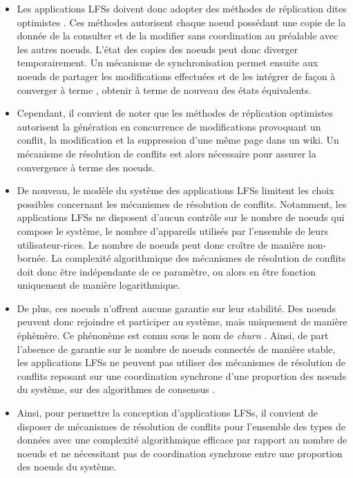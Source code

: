 \begin{itemize}
\begin{definition}[Cohérence]
      \end{definition}
      Les applications \acp{LFS} ne peuvent donc pas reposer sur des méthodes de réplication dites pessimistes, \ie qui empêchent toutes modifications concurrentes d'une même donnée.
    \item Les applications \acp{LFS} doivent donc adopter des méthodes de réplication dites optimistes \cite{2005-optimistic-replication-saito}.
      Ces méthodes autorisent chaque noeud possédant une copie de la donnée de la consulter et de la modifier sans coordination au préalable avec les autres noeuds.
      L'état des copies des noeuds peut donc diverger temporairement.
      Un mécanisme de synchronisation permet ensuite aux noeuds de partager les modifications effectuées et de les intégrer de façon à converger à terme \cite{10.1145/224057.224070}, \ie obtenir à terme de nouveau des états équivalents.
    \item Cependant, il convient de noter que les méthodes de réplication optimistes autorisent la génération en concurrence de modifications provoquant un conflit, \eg la modification et la suppression d'une même page dans un wiki.
      Un mécanisme de résolution de conflits est alors nécessaire pour assurer la convergence à terme des noeuds.
    \item De nouveau, le modèle du système des applications \acp{LFS} limitent les choix possibles concernant les mécanismes de résolution de conflits.
      Notamment, les applications \acp{LFS} ne disposent d'aucun contrôle sur le nombre de noeuds qui compose le système, \ie le nombre d'appareils utilisés par l'ensemble de leurs utilisateur-rices.
      Le nombre de noeuds peut donc croître de manière non-bornée.
      La complexité algorithmique des mécanismes de résolution de conflits doit donc être indépendante de ce paramètre, ou alors en être fonction uniquement de manière logarithmique.
    \item De plus, ces noeuds n'offrent aucune garantie sur leur stabilité.
      Des noeuds peuvent donc rejoindre et participer au système, mais uniquement de manière éphèmère.
      Ce phénonème est connu sous le nom de \emph{churn} \cite{understandingChurnP2PNetworks2006}.
      Ainsi, de part l'absence de garantie sur le nombre de noeuds connectés de manière stable, les applications \acp{LFS} ne peuvent pas utiliser des mécanismes de résolution de conflits reposant sur une coordination synchrone d'une proportion des noeuds du système, \ie sur des algorithmes de consensus \cite{1998-paxos-lamport, 2014-raft-ongaro}.
    \item Ainsi, pour permettre la conception d'applications \acp{LFS}, il convient de disposer de mécanismes de résolution de conflits pour l'ensemble des types de données avec une complexité algorithmique efficace par rapport au nombre de noeuds et ne nécessitant pas de coordination synchrone entre une proportion des noeuds du système.
\end{itemize}

